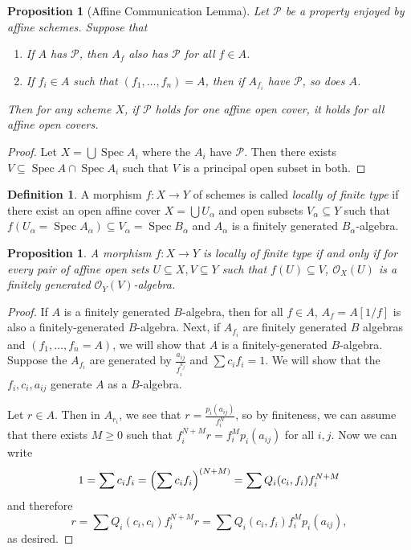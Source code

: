 \documentclass[leqno, openany]{memoir}
\newtheorem{prop}[thm]{Proposition}
\theoremstyle{definition}
\newtheorem{defn}[thm]{Definition}
\theoremstyle{remark}
\theoremstyle{plain}
\theoremstyle{definition}
\theoremstyle{remark}
\newcommand{\mc}[1]{\mathcal{#1}}
\DeclareMathOperator{\Spec}{Spec}
\begin{document}
\begin{prop}[Affine Communication Lemma] Let $\mc{P}$ be a property enjoyed by
    affine schemes. Suppose that \begin{enumerate} \item If $A$ has $\mc{P}$,
        then $A_f$ also has $\mc{P}$ for all $f \in A$.  \item If $f_i \in A$
        such that $(f_1, \ldots, f_n) = A$, then if $A_{f_i}$ have $\mc{P}$, so
        does $A$.  \end{enumerate} Then for any scheme $X$, if $\mc{P}$ holds
    for one affine open cover, it holds for all affine open covers.  \end{prop}

\begin{proof} Let $X = \bigcup \Spec A_i$ where the $A_i$ have $\mc{P}$. Then
there exists $V \subseteq \Spec A \cap \Spec A_i$ such that $V$ is a principal
open subset in both.  \end{proof}

\begin{defn} A morphism $f \colon X \to Y$ of schemes is called \textit{locally
    of finite type} if there exist an open affine cover $X = \bigcup
    U_{\alpha}$ and open subsets $V_{\alpha} \subseteq Y$ such that
    $f(U_{\alpha} = \Spec A_{\alpha}) \subseteq V_{\alpha} = \Spec B_{\alpha}$
    and $A_{\alpha}$ is a finitely generated $B_{\alpha}$-algebra.  \end{defn}

\begin{prop} A morphism $f \colon X \to Y$ is locally of finite type if and
    only if for every pair of affine open sets $U \subseteq X, V \subseteq Y$
    such that $f(U) \subseteq V$, $\mc{O}_X(U)$ is a finitely generated
    $\mc{O}_Y(V)$-algebra.  \end{prop}

\begin{proof} If $A$ is a finitely generated $B$-algebra, then for all $f \in
    A$, $A_f = A[1/f]$ is also a finitely-generated $B$-algebra. Next, if
    $A_{f_i}$ are finitely generated $B$ algebras and $(f_1, \ldots, f_n = A)$,
    we will show that $A$ is a finitely-generated $B$-algebra. Suppose the
    $A_{f_i}$ are generated by $\frac{a_{ij}}{f_i^{k_j}}$ and $\sum c_i f_i =
    1$. We will show that the $f_i, c_i, a_{ij}$ generate $A$ as a $B$-algebra.

    Let $r \in A$. Then in $A_{r_i}$, we see that $r =
    \frac{p_i(a_{ij})}{f_i^N}$, so by finiteness, we can assume that there
    exists $M \geq 0$ such that $f_i^{N+M} r = f_i^M p_i (a_{ij})$ for all
    $i,j$. Now we can write \[ 1 = \sum c_i f_i = { \qty(\sum c_i f_i)
    }^{(N+M)} = \sum Q_i(c_i, f_i) f_i^{N+M} \] and therefore \[ r = \sum
Q_i(c_i, c_i) f_i^{N+M} r = \sum Q_i(c_i, f_i) f_i^M p_i(a_{ij}), \] as
desired.  \end{proof}
\end{document}
